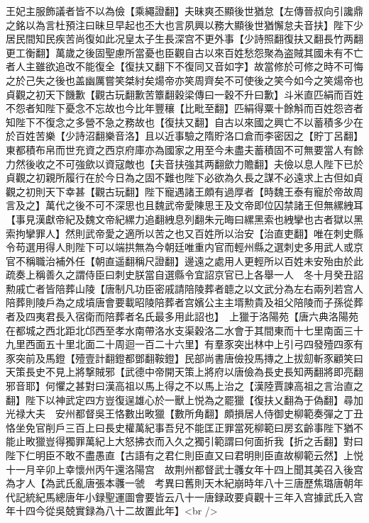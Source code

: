 王妃主服飾議者皆不以為儉【乘繩證翻】夫昧爽丕顯後世猶怠【左傳晉叔向引讒鼎之銘以為言杜預注曰昧旦早起也丕大也言夙興以務大顯後世猶懈怠夫音扶】陛下少居民間知民疾苦尚復如此况皇太子生長深宫不更外事【少詩照翻復扶又翻長竹两翻更工衡翻】萬歲之後固聖慮所當憂也臣觀自古以來百姓愁怨聚為盗賊其國未有不亡者人主雖欲追改不能復全【復扶又翻下不復同又音如字】故當修於可修之時不可悔之於己失之後也盖幽厲嘗笑桀紂矣煬帝亦笑周齊矣不可使後之笑今如今之笑煬帝也貞觀之初天下饑歉【觀古玩翻歉苦簟翻穀梁傳曰一穀不升曰歉】斗米直匹絹而百姓不怨者知陛下憂念不忘故也今比年豐穰【比毗至翻】匹絹得粟十餘斛而百姓怨咨者知陛下不復念之多營不急之務故也【復扶又翻】自古以來國之興亡不以蓄積多少在於百姓苦樂【少詩沼翻樂音洛】且以近事驗之隋貯洛口倉而李密因之【貯丁呂翻】東都積布帛而世充資之西京府庫亦為國家之用至今未盡夫蓄積固不可無要當人有餘力然後收之不可強歛以資寇敵也【夫音扶強其两翻歛力贍翻】夫儉以息人陛下已於貞觀之初親所履行在於今日為之固不難也陛下必欲為久長之謀不必遠求上古但如貞觀之初則天下幸甚【觀古玩翻】陛下寵遇諸王頗有過厚者【時魏王泰有寵於帝故周言及之】萬代之後不可不深思也且魏武帝愛陳思王及文帝即位囚禁諸王但無縲絏耳【事見漢獻帝紀及魏文帝紀縲力追翻絏息列翻朱元晦曰縲黑索也絏攣也古者獄以黑索拘攣罪人】然則武帝愛之適所以苦之也又百姓所以治安【治直吏翻】唯在刺史縣令苟選用得人則陛下可以端拱無為今朝廷唯重内官而輕州縣之選刺史多用武人或京官不稱職治補外任【朝直遥翻稱尺證翻】邊遠之處用人更輕所以百姓未安殆由於此疏奏上稱善久之謂侍臣曰刺史朕當自選縣令宜詔京官已上各舉一人　冬十月癸丑詔勲戚亡者皆陪葬山陵【唐制凡功臣密戚請陪陵葬者聼之以文武分為左右兩列若宫人陪葬則陵戶為之成墳唐會要載昭陵陪葬者宫嬪公主主壻勲貴及祖父陪陵而子孫從葬者及四夷君長入宿衛而陪葬者名氏最多用此詔也】　上獵于洛陽苑【唐六典洛陽苑在都城之西北距北邙西至孝水南帶洛水支渠穀洛二水會于其間東而十七里南面三十九里西面五十里北面二十周迴一百二十六里】有羣豕突出林中上引弓四發殪四豕有豕突前及馬鐙【殪壹計翻鐙都鄧翻鞍鐙】民部尚書唐儉投馬摶之上拔劎斬豕顧笑曰天策長史不見上將撃賊邪【武德中帝開天策上將府以唐儉為長史長知两翻將即亮翻邪音耶】何懼之甚對曰漢高祖以馬上得之不以馬上治之【漢陸賈諫高祖之言治直之翻】陛下以神武定四方豈復逞雄心於一獸上悦為之罷獵【復扶乂翻為于偽翻】尋加光禄大夫　安州都督吳王恪數出畋獵【數所角翻】頗損居人侍御史柳範奏彈之丁丑恪坐免官削戶三百上曰長史權萬紀事吾兒不能匡正罪當死柳範曰房玄齡事陛下猶不能止畋獵豈得獨罪萬紀上大怒拂衣而入久之獨引範謂曰何面折我【折之舌翻】對曰陛下仁明臣不敢不盡愚直【古語有之君仁則臣直又曰君明則臣直故柳範云然】上悦　十一月辛卯上幸懷州丙午還洛陽宫　故荆州都督武士彠女年十四上聞其美召入後宫為才人【為武氏亂唐張本彠一虢　考異曰舊則天木紀崩時年八十三唐歷焦璐唐朝年代記統紀馬總唐年小録聖運圖會要皆云八十一唐録政要貞觀十三年入宫據武氏入宫年十四今從吳兢實録為八十二故置此年】<br />
